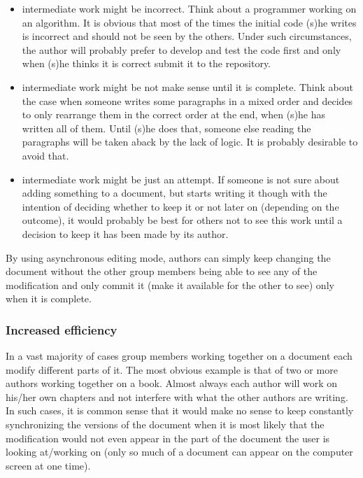 \begin{itemize}
\item intermediate work might be incorrect. Think about a programmer working on an algorithm. It
      is obvious that most of the times the initial code (s)he writes is incorrect and should not
      be seen by the others. Under such circumstances, the author will probably prefer to develop
      and test the code first and only when (s)he thinks it is correct submit it to the repository.
\item intermediate work might be not make sense until it is complete. Think about the case when
      someone writes some paragraphs in a mixed order and decides to only rearrange them in the
      correct order at the end, when (s)he has written all of them. Until (s)he does that, someone
      else reading the paragraphs will be taken aback by the lack of logic. It is probably desirable
      to avoid that.
\item intermediate work might be just an attempt. If someone is not sure about adding something to
      a document, but starts writing it though with the intention of deciding whether to keep it
      or not later on (depending on the outcome), it would probably be best for others not to see
      this work until a decision to keep it has been made by its author.
\end{itemize}

By using asynchronous editing mode, authors can simply keep changing the document without the other
group members being able to see any of the modification and only commit it (make it available for
the other to see) only when it is complete.

\subsubsection{Increased efficiency}

In a vast majority of cases group members working together on a document each modify different parts
of it. The most obvious example is that of two or more authors working together on a book. Almost always
each author will work on his/her own chapters and not interfere with what the other authors are writing.
In such cases, it is common sense that it would make no sense to keep constantly synchronizing the
versions of the document when it is most likely that the modification would not even appear in the
part of the document the user is looking at/working on (only so much of a document can appear on the
computer screen at one time).

